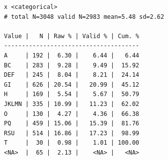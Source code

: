 \documentclass[
  letterpaper,
  DIV=11,
  numbers=noendperiod]{scrreprt}
\newenvironment{Shaded}{\begin{snugshade}}{\end{snugshade}}
\newcommand{\AttributeTok}[1]{\textcolor[rgb]{0.40,0.45,0.13}{#1}}
\newcommand{\DecValTok}[1]{\textcolor[rgb]{0.68,0.00,0.00}{#1}}
\newcommand{\FunctionTok}[1]{\textcolor[rgb]{0.28,0.35,0.67}{#1}}
\newcommand{\NormalTok}[1]{\textcolor[rgb]{0.00,0.23,0.31}{#1}}
\newcommand{\OtherTok}[1]{\textcolor[rgb]{0.00,0.23,0.31}{#1}}
\newcommand{\SpecialCharTok}[1]{\textcolor[rgb]{0.37,0.37,0.37}{#1}}
\newcommand{\StringTok}[1]{\textcolor[rgb]{0.13,0.47,0.30}{#1}}
\begin{document}
\begin{Shaded}
\end{Shaded}

\begin{verbatim}
x <categorical> 
# total N=3048 valid N=2983 mean=5.48 sd=2.62

Value |   N | Raw % | Valid % | Cum. %
--------------------------------------
A     | 192 |  6.30 |    6.44 |   6.44
BC    | 283 |  9.28 |    9.49 |  15.92
DEF   | 245 |  8.04 |    8.21 |  24.14
GI    | 626 | 20.54 |   20.99 |  45.12
H     | 169 |  5.54 |    5.67 |  50.79
JKLMN | 335 | 10.99 |   11.23 |  62.02
O     | 130 |  4.27 |    4.36 |  66.38
PQ    | 459 | 15.06 |   15.39 |  81.76
RSU   | 514 | 16.86 |   17.23 |  98.99
T     |  30 |  0.98 |    1.01 | 100.00
<NA>  |  65 |  2.13 |    <NA> |   <NA>
\end{verbatim}
\end{document}
